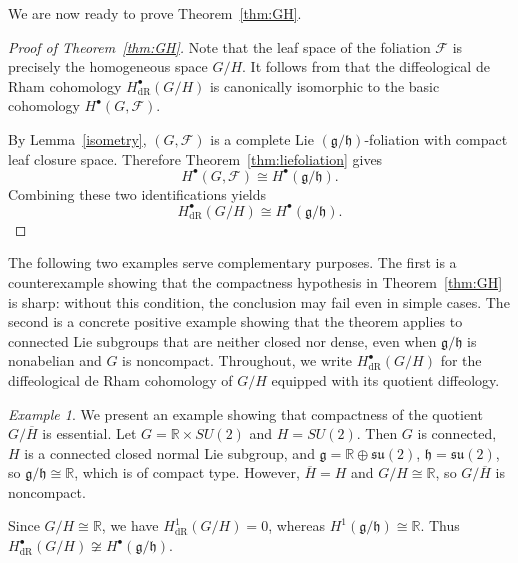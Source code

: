 \documentclass[reqno, 11pt]{amsart}
\theoremstyle{definition}
\theoremstyle{property}
\theoremstyle{remark}
\newtheorem{ex}[thm]{Example}
\numberwithin{equation}{section}
\begin{document}
We are now ready to prove Theorem~\ref{thm:GH}.


\begin{proof}[Proof of Theorem~\ref{thm:GH}]
Note that the leaf space of the foliation $\mathcal F$ is precisely the
homogeneous space $G/H$. It follows from \cite[Theorem 3.5]{HMS} that the
diffeological de Rham cohomology $H^\bullet_{\mathrm{dR}}(G/H)$ is canonically
isomorphic to the basic cohomology $H^\bullet(G,\mathcal F)$.

By Lemma~\ref{isometry}, $(G,\mathcal F)$ is a complete Lie
$(\mathfrak g/\mathfrak h)$-foliation with compact leaf closure space.
Therefore Theorem~\ref{thm:liefoliation} gives
\[
H^\bullet(G,\mathcal F)\cong H^\bullet(\mathfrak g/\mathfrak h).
\]
Combining these two identifications yields
\[
H^\bullet_{\mathrm{dR}}(G/H)\cong H^\bullet(\mathfrak g/\mathfrak h).
\]
\end{proof}

The following two examples serve complementary purposes. The first is a
counterexample showing that the compactness hypothesis in
Theorem~\ref{thm:GH} is sharp: without this condition, the conclusion may
fail even in simple cases. The second is a concrete positive example
showing that the theorem applies to connected Lie subgroups that are
neither closed nor dense, even when $\mathfrak g/\mathfrak h$ is
nonabelian and $G$ is noncompact. Throughout, we write
$H^\bullet_{\mathrm{dR}}(G/H)$ for the diffeological de Rham cohomology
of $G/H$ equipped with its quotient diffeology.
\begin{ex}
We present an example showing that compactness of the
quotient $G/\overline H$ is essential. Let
$G=\mathbb R\times SU(2)$ and $H=SU(2)$. Then $G$ is connected,
$H$ is a connected closed normal Lie subgroup, and
$\mathfrak g=\mathbb R\oplus \mathfrak{su}(2)$,
$\mathfrak h=\mathfrak{su}(2)$, so
$\mathfrak g/\mathfrak h\cong \mathbb R$, which is of compact type.
However, $\overline H=H$ and $G/H\cong \mathbb R$, so
$G/\overline H$ is noncompact.

Since $G/H\cong \mathbb R$, we have
$H^1_{\mathrm{dR}}(G/H)=0$, whereas
$H^1(\mathfrak g/\mathfrak h)\cong \mathbb R$. Thus
$H^\bullet_{\mathrm{dR}}(G/H)\not\cong H^\bullet(\mathfrak g/\mathfrak h)$.
\end{ex}
\end{document}
